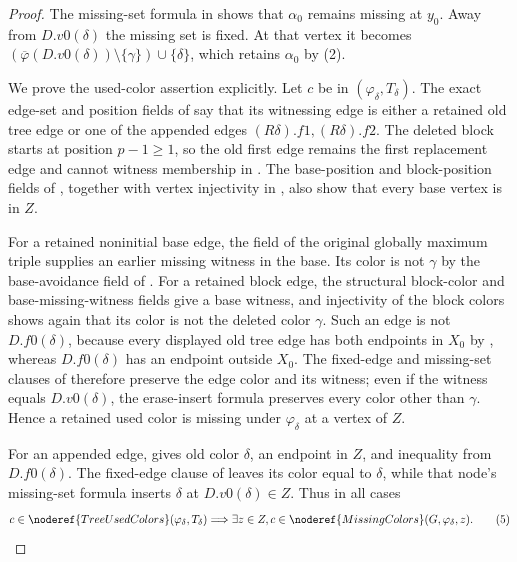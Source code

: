 \begin{proof}
The missing-set formula in 
shows that $\alpha_0$ remains missing at $y_0$.  Away from
$D.v0(\delta)$ the missing set is fixed.  At that vertex it becomes
$(\overline\varphi(D.v0(\delta))\setminus\{\gamma\})
\cup\{\delta\}$, which retains $\alpha_0$ by (2).

We prove the used-color assertion explicitly.  Let $c$ be in
$(\varphi_\delta,T_\delta)$.  The exact edge-set
and position fields of  say that its
witnessing edge is either a retained old tree edge or one of the appended
edges $(R\delta).f1,(R\delta).f2$.  The deleted block starts at position
$p-1\geq1$, so the old first edge remains the first replacement edge and
cannot witness membership in .  The base-position
and block-position fields of ,
together with vertex injectivity in , also show
that every base vertex is in $Z$.

For a retained noninitial base edge, the
 field of the original globally maximum triple
supplies an earlier missing witness in the base.  Its color is not
$\gamma$ by the base-avoidance field of
.  For a retained block edge,
the structural block-color and base-missing-witness fields give a base
witness, and injectivity of the block colors shows again that its color
is not the deleted color $\gamma$.  Such an edge is not $D.f0(\delta)$,
because every displayed old tree edge has both endpoints in $X_0$ by
, whereas $D.f0(\delta)$ has an endpoint outside
$X_0$.  The fixed-edge and missing-set clauses of
 therefore preserve the edge color
and its witness; even if the witness equals $D.v0(\delta)$, the
erase-insert formula preserves every color other than $\gamma$.  Hence a
retained used color is missing under $\varphi_\delta$ at a vertex of $Z$.

For an appended edge,  gives old color
$\delta$, an endpoint in $Z$, and inequality from $D.f0(\delta)$.
The fixed-edge clause of  leaves
its color equal to $\delta$, while that node's missing-set formula
inserts $\delta$ at $D.v0(\delta)\in Z$.  Thus in all cases
\[
 c\in\noderef{TreeUsedColors}(\varphi_\delta,T_\delta)
 \Longrightarrow
 \exists z\in Z,
 c\in\noderef{MissingColors}(G,\varphi_\delta,z).           \tag{5}
\]


\end{proof}
